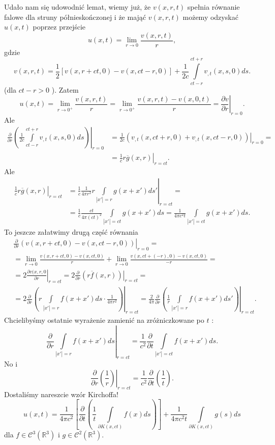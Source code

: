 \documentclass[../main.tex]{subfiles}
\begin{document}
		Udało nam się udowodnić lemat, wiemy już, że $v(x,r,t)$ spełnia równanie falowe dla struny półnieskończonej i że mająć $v(x,r,t)$ możemy odzyskać $u(x,t)$ poprzez przejście
		\[
				u(x,t) = \lim_{r \to 0}\frac{v(x,r,t)}{r}
		,\]
		gdzie
		\[
				v(x,r,t) = \frac{1}{2}\left[ v(x,r+ct,0) - v(x,ct-r,0) \right] + \frac{1}{2c}\int\limits_{ct-r}^{ct+r}v_{,t}(x,s,0)d s
		.\]
		(dla $ct-r>0$ ). Zatem
		\[
				u(x,t) = \lim_{r \to 0^+}\frac{v(x,r,t)}{r} = \lim_{r \to 0^+}\frac{v(x,r,t) - v(x,0,t)}{r} = \left.\frac{\partial v}{\partial r} \right|_{r=0}
		.\]
		Ale
		\begin{align*}
				\frac{\partial }{\partial r} \left.\left( \frac{1}{2c}\int\limits_{ct-r}^{ct+r}v_{,t}(x,s,0)d s \right)\right|_{r=0} &= \frac{1}{2c}\left.\left( v_{,t}(x,ct+r,0) + v_{,t}(x,ct-r,0) \right) \right|_{r=0} = \\
				&= \left.\frac{1}{c}r \overline{g} (x,r)\right|_{r=ct}
		.\end{align*}
		Ale
		\begin{align*}
				\left.\frac{1}{c}r \overline{g} (x,r) \right|_{r=ct} &= \left.\frac{1}{c} \frac{1}{4\pi r^2} r \int\limits_{|x'|=r} g(x+x')d s'\right|_{r=ct} = \\
				&= \frac{1}{c} \frac{ct}{4\pi (ct)^2} \int\limits_{|x'| = ct}g(x+x')d s = \frac{1}{4\pi c^2 t} \int\limits_{|x'| = ct} g(x+x')d s
		.\end{align*}
		To jeszcze załatwimy drugą część równania
		\begin{align*}
				&\left.\frac{\partial }{\partial r} \left( v(x,r+ct,0) - v(x,ct-r,0) \right)\right|_{r=0} =\\
				&= \lim_{r \to 0} \frac{v(x,r+ct,0) - v(x,ct,0)}{r} + \lim_{r \to 0}\frac{v(x,ct+(-r),0) - v(x,ct,0)}{-r} = \\
				&= 2 \left.\frac{\partial v(x,r,0}{\partial r}\right|_{r = ct} = 2 \left.\frac{\partial }{\partial r} \left( r \overline{f} (x,r) \right) \right|_{r=ct} = \\
				&= 2 \frac{\partial }{\partial r} \left.\left( r \int\limits_{|x'| = r} f(x+x')d s \cdot \frac{1}{4 \pi r^2}\right) \right|_{r=ct} = \frac{2}{4 \pi} \frac{\partial }{\partial r} \left.\left( \frac{1}{r}\int\limits_{|x'|=r}f(x+x')d s' \right) \right|_{r = ct}
		.\end{align*}
		Chcielibyśmy ostatnie wyrażenie zamienić na zróżniczkowane po $t$ :
		\[
				\left.	\frac{\partial }{\partial r} \int\limits_{|x'| = r}f(x+x')d s\right|_{r=ct} = \frac{1}{c^2}\frac{\partial }{\partial t} \int\limits_{|x'|=ct}f(x+x')d s
		.\]
		No i
		\[
				\left.\frac{\partial }{\partial r} \left( \frac{1}{r} \right) \right|_{r=ct} = \frac{1}{c^2}\frac{\partial }{\partial t} \left( \frac{1}{t} \right)
		.\]
		Dostaliśmy nareszcie wzór Kirchoffa!
		\[
				u(x,t) = \frac{1}{4\pi c^2} \left[ \frac{\partial }{\partial t} \left( \frac{1}{t}\int\limits_{\partial K(x,ct)}f(x) d s \right)  \right] + \frac{1}{4\pi c^2 t}\int\limits_{\partial K(x,ct)}g(s) d s
		\]
		dla $f\in \mathcal{C}^3(\mathbb{R}^3)$ i $g\in \mathcal{C}^2(\mathbb{R}^3)$.
\end{document}

